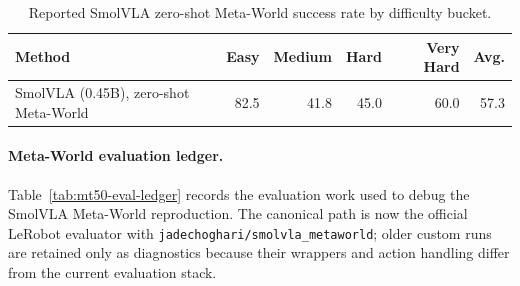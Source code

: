 \documentclass{article}
\begin{document}
\begin{table}[h]
  \centering
  \begin{tabular}{lrrrrr}
    \toprule
    Method & Easy & Medium & Hard & Very Hard & Avg. \\
    \midrule
    SmolVLA (0.45B), zero-shot Meta-World & 82.5 & 41.8 & 45.0 & 60.0 & 57.3 \\
    \bottomrule
  \end{tabular}
  \caption{Reported SmolVLA zero-shot Meta-World success rate by difficulty bucket.}
  \label{tab:smolvla-metaworld-reported-zero-shot}
\end{table}


\paragraph{Meta-World evaluation ledger.}
Table~\ref{tab:mt50-eval-ledger} records the evaluation work used to debug the SmolVLA Meta-World reproduction.  The canonical path is now the official LeRobot evaluator with \texttt{jadechoghari/smolvla\_metaworld}; older custom runs are retained only as diagnostics because their wrappers and action handling differ from the current evaluation stack.
\end{document}
